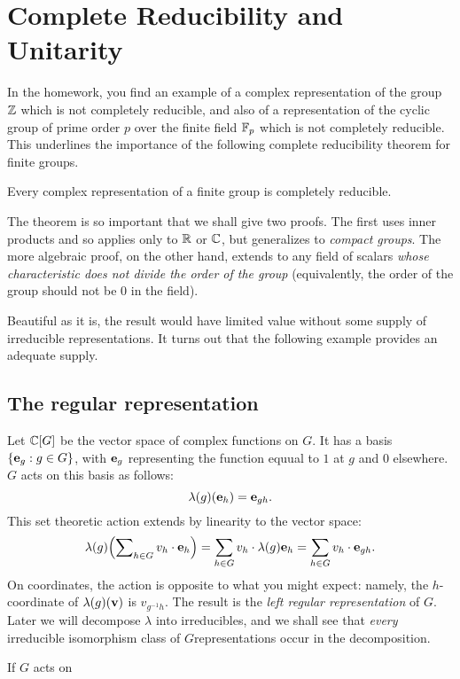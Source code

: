 \chapter{Complete Reducibility and Unitarity}
In the homework, you find an example of a complex representation of the
group \(\mathbb{Z}\) which is not completely reducible, and also of a
representation of the cyclic group of prime order \(p\) over the finite
field \(\mathbb{F}_p\) which is not completely reducible. This underlines the
importance of the following complete reducibility theorem for finite
groups.

\begin{theorem}
  Every complex representation of a finite group is completely reducible.
\end{theorem}

The theorem is so important that we shall give two proofs. The first uses
inner products and so applies only to \(\mathbb{R}\) or \(\mathbb{C}\), but generalizes
to \emph{compact groups}. The more algebraic proof, on the other hand,
extends to any field of scalars \emph{whose characteristic does not divide
  the order of the group} (equivalently, the order of the group should not
be \(0\) in the field).

Beautiful as it is, the result would have limited value without some supply
of irreducible representations. It turns out that the following example
provides an adequate supply.

\section{The regular representation}
Let \(\mathbb{C}[G]\) be the vector space of complex functions on \(G\). It has a
basis \(\{\mathbf{e}_g:g\in G\}\), with \(\mathbf{e}_g\) representing the function
equual to \(1\) at \(g\) and \(0\) elsewhere. \(G\) acts on this basis as
follows:
\[
  \lambda(g)(\mathbf{e}_h)=\mathbf{e}_{gh}.
\]
This set theoretic action extends by linearity to the vector space:
\[
  \lambda(g)\Bigl(\sum\nolimits_{h\in G} v_h\cdot\mathbf{e}_h\Bigr)
  =\sum_{h\in G}v_h\cdot\lambda(g)\mathbf{e}_h
  =\sum_{h\in G}v_h\cdot\mathbf{e}_{gh}.
\]
On coordinates, the action is opposite to what you might expect: namely,
the \(h\)-coordinate of \(\lambda(g)(\mathbf{v})\) is \(v_{g^{-1}h}\). The result
is the \emph{left regular representation} of \(G\). Later we will decompose
\(\lambda\) into irreducibles, and we shall see that \emph{every}
irreducible isomorphism class of \(G\)representations occur in the
decomposition.

\begin{remark}
  If \(G\) acts on
\end{remark}

